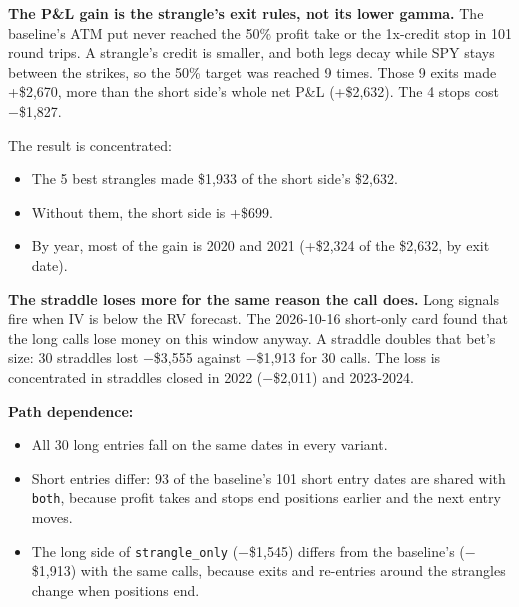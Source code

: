 \documentclass{article}
\begin{document}
\textbf{The P\&L gain is the strangle's exit rules, not its lower gamma.} The baseline's ATM put never reached the 50\% profit take or the 1x-credit stop in 101 round trips. A strangle's credit is smaller, and both legs decay while SPY stays between the strikes, so the 50\% target was reached 9 times. Those 9 exits made +\$2,670, more than the short side's whole net P\&L (+\$2,632). The 4 stops cost \ensuremath{-}\$1,827.

The result is concentrated:

\begin{itemize}

\item The 5 best strangles made \$1,933 of the short side's \$2,632.

\item Without them, the short side is +\$699.

\item By year, most of the gain is 2020 and 2021 (+\$2,324 of the \$2,632, by exit date).

\end{itemize}

\textbf{The straddle loses more for the same reason the call does.} Long signals fire when IV is below the RV forecast. The 2026-10-16 short-only card found that the long calls lose money on this window anyway. A straddle doubles that bet's size: 30 straddles lost \ensuremath{-}\$3,555 against \ensuremath{-}\$1,913 for 30 calls. The loss is concentrated in straddles closed in 2022 (\ensuremath{-}\$2,011) and 2023-2024.

\textbf{Path dependence:}

\begin{itemize}

\item All 30 long entries fall on the same dates in every variant.

\item Short entries differ: 93 of the baseline's 101 short entry dates are shared with \texttt{both}, because profit takes and stops end positions earlier and the next entry moves.

\item The long side of \texttt{strangle\_\allowbreak{}only} (\ensuremath{-}\$1,545) differs from the baseline's (\ensuremath{-}\$1,913) with the same calls, because exits and re-entries around the strangles change when positions end.

\end{itemize}
\end{document}
